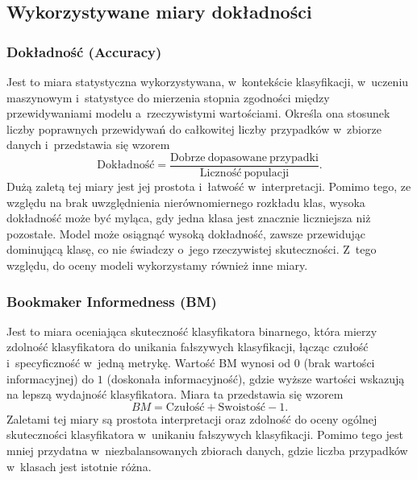 \documentclass[12pt]{article}
\begin{document}
	\subsection{Wykorzystywane miary dokładności}\label{subsec:miary-dokladnosci}

	\subsubsection{Dokładność (Accuracy)}
	Jest to miara statystyczna wykorzystywana, w~kontekście klasyfikacji, w~uczeniu maszynowym i~statystyce do mierzenia stopnia zgodności między przewidywaniami modelu a~rzeczywistymi wartościami.
	Określa ona stosunek liczby poprawnych przewidywań do całkowitej liczby przypadków w~zbiorze danych i~przedstawia się wzorem
	\[\mathrm{Dokładność} = \frac{\mathrm{Dobrze~dopasowane~przypadki}}{\mathrm{Liczność~populacji}}.\]
	Dużą zaletą tej miary jest jej prostota i~łatwość w~interpretacji.
	Pomimo tego, ze względu na brak uwzględnienia nierównomiernego rozkładu klas, wysoka dokładność może być myląca, gdy jedna klasa jest znacznie liczniejsza niż pozostałe.
	Model może osiągnąć wysoką dokładność, zawsze przewidując dominującą klasę, co nie świadczy o~jego rzeczywistej skuteczności.
	Z~tego względu, do oceny modeli wykorzystamy również inne miary.

	\subsubsection{Bookmaker Informedness (BM)}
	Jest to miara oceniająca skuteczność klasyfikatora binarnego, która mierzy zdolność klasyfikatora do unikania fałszywych klasyfikacji, łącząc czułość i~specyficzność w~jedną metrykę.
	Wartość BM wynosi od $0$ (brak wartości informacyjnej) do $1$ (doskonała informacyjność), gdzie wyższe wartości wskazują na lepszą wydajność klasyfikatora.
	Miara ta przedstawia się wzorem
	\[BM = \mathrm{Czułość} + \mathrm{Swoistość} - 1.\]
	Zaletami tej miary są prostota interpretacji oraz zdolność do oceny ogólnej skuteczności klasyfikatora w~unikaniu fałszywych klasyfikacji.
	Pomimo tego jest mniej przydatna w~niezbalansowanych zbiorach danych, gdzie liczba przypadków w~klasach jest istotnie różna.
\end{document}
